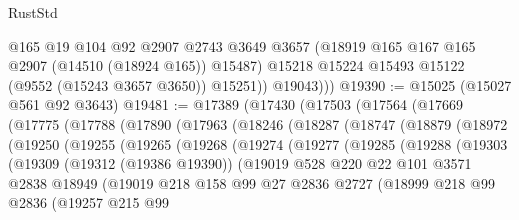 \begin{lexlean}{RustStd}
\begin{coremodule}
              @165
              @19
              @104
              @92
              @2907
              @2743
              @3649
              @3657
              (@18919 @165 @167 @165 @2907 (@14510 (@18924 @165)) @15487)
              @15218
              @15224
              @15493
              @15122
              (@9552 (@15243 @3657 @3650))
              @15251))
          @19043)))
@19390 := @15025 (@15027 @561 @92 @3643)
@19481 := @17389
    (@17430
      (@17503
        (@17564
          (@17669
            (@17775
              (@17788
                (@17890
                  (@17963
                    (@18246
                      (@18287
                        (@18747
                          (@18879
                            (@18972
                              (@19250
                                (@19255
                                  (@19265
                                    (@19268
                                      (@19274
                                        (@19277
                                          (@19285
                                            (@19288
                                              (@19303
                                                (@19309
                                                  (@19312 (@19386 @19390))
                                                  (@19019
                                                    @528
                                                    @220
                                                    @22
                                                    @101
                                                    @3571
                                                    @2838
                                                    @18949
                                                    (@19019
                                                      @218
                                                      @158
                                                      @99
                                                      @27
                                                      @2836
                                                      @2727
                                                      (@18999
                                                        @218
                                                        @99
                                                        @2836
                                                        (@19257
                                                          @215
                                                          @99

\end{coremodule}
\end{lexlean}
